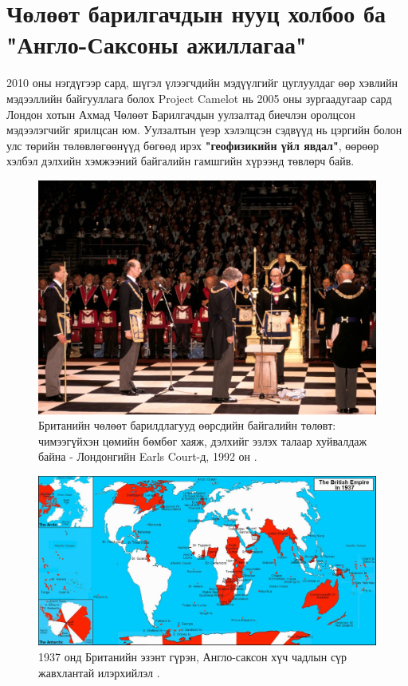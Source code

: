 \documentclass[10pt,twocolumn,letterpaper]{article}
\begin{document}
\section{Чөлөөт барилгачдын нууц холбоо ба "Англо-Саксоны ажиллагаа"}

2010 оны нэгдүгээр сард, шүгэл үлээгчдийн мэдүүлгийг цуглуулдаг өөр хэвлийн мэдээллийн байгууллага болох Project Camelot нь 2005 оны зургаадугаар сард Лондон хотын Ахмад Чөлөөт Барилгачдын уулзалтад биечлэн оролцсон мэдээлэгчийг \cite{4,6} ярилцсан юм. Уулзалтын үеэр хэлэлцсэн сэдвүүд нь цэргийн болон улс төрийн төлөвлөгөөнүүд бөгөөд ирэх \textbf{"геофизикийн үйл явдал"}, өөрөөр хэлбэл дэлхийн хэмжээний байгалийн гамшгийн хүрээнд төвлөрч байв.

\begin{figure}[b]
\begin{center}
\includegraphics[width=1\linewidth]{freemason.jpg}
\end{center}
   \caption{Британийн чөлөөт барилдлагууд өөрсдийн байгалийн төлөвт: чимээгүйхэн цөмийн бөмбөг хаяж, дэлхийг эзлэх талаар хуйвалдаж байна - Лондонгийн Earls Court-д, 1992 он \cite{5}.}
\label{fig:1}
\label{fig:onecol}
\end{figure}

\begin{figure}[t]
\begin{center}
\includegraphics[width=1\textwidth]{british.jpg}
\end{center}
   \caption{1937 онд Британийн эзэнт гүрэн, Англо-саксон хүч чадлын сүр жавхлантай илэрхийлэл \cite{14}.}
   \label{fig:2}
\end{figure}
\end{document}
